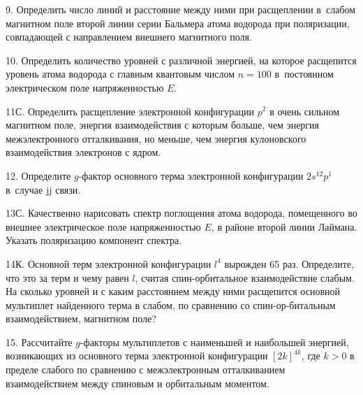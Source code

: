 \par
9. Определить число линий и расстояние между ними при расщеплении в~слабом магнитном поле второй линии серии Бальмера атома водорода при поляризации, совпадающей с направлением внешнего магнитного поля.
\par
10. Определить количество уровней с различной энергией, на которое расщепится уровень атома водорода с главным квантовым числом $n = 100$ в~постоянном электрическом поле напряженностью $E$.
\par
11С. Определить расщепление электронной конфигурации $p^2$ в очень сильном магнитном поле, энергия взаимодействия с которым больше, чем энергия межэлектронного отталкивания, но меньше, чем энергия кулоновского взаимодействия электронов с ядром.
\par
12. Определите $g$-фактор основного терма электронной конфигурации $2s^12p^1$ в~случае jj связи.
\par
13С. Качественно нарисовать спектр поглощения атома водорода, помещенного во внешнее электрическое поле напряженностью $E$, в районе второй линии Лаймана. Указать поляризацию компонент спектра.
\par
14К. Основной терм электронной конфигурации $l^4$ вырожден 65 раз. Определите, что это за терм и чему равен $l$, считая спин-орбитальное взаимодействие слабым. На сколько уровней и с каким расстоянием между ними расщепится основной мультиплет найденного терма в слабом, по сравнению со спин-ор-битальным взаимодействием, магнитном поле?
\par
15. Рассчитайте $g$-факторы мультиплетов с наименьшей и наибольшей энергией, возникающих из основного терма электронной конфигурации $[2k]^{4k}$, где $k>0$ в пределе слабого по сравнению с межэлектронным отталкиванием взаимодействием между спиновым и орбитальным моментом.
\par
